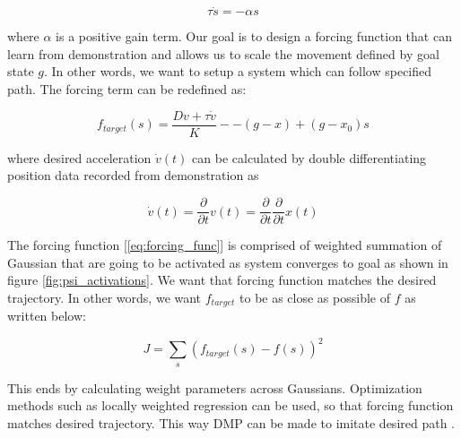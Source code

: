 \documentclass[sigconf]{acmart}
\begin{document}
\begin{equation}
	\tau \dot{s} = - \alpha s
\end{equation}

where $\alpha$ is a positive gain term. Our goal is to design a forcing function that can learn from demonstration and allows us to scale the movement defined by goal state $g$. In other words, we want to setup a system which can follow specified path. The forcing term can be redefined as:

\begin{equation}
	f_{target}(s) = \frac{D v + \tau \dot{v}}{K} - - (g - x) +  (g - x_0) s
\end{equation}

where desired acceleration $\dot{v}(t)$ can be calculated by double differentiating position data recorded from demonstration as

\begin{equation}
	\dot{v}(t) = \frac{\partial}{\partial t} v(t) = \frac{\partial}{\partial t} \frac{\partial}{\partial t} x(t)
\end{equation}

The forcing function [\ref{eq:forcing_func}] is comprised of weighted summation of Gaussian that are going to be activated as system converges to goal as shown in figure \ref{fig:psi_activations}. We want that forcing function matches the desired trajectory. In other words, we want $f_{target}$ to be as close as possible of $f$ as written below:

\begin{equation}
	J = \sum_{s} \left( f_{target}(s) - f(s) \right)^2
\end{equation}

This ends by calculating weight parameters across Gaussians. Optimization methods such as locally weighted regression \cite{vijayakumar2000locally} can be used, so that forcing function matches desired trajectory. This way DMP can be made to imitate desired path \cite{pastor2009learning}.
\end{document}
